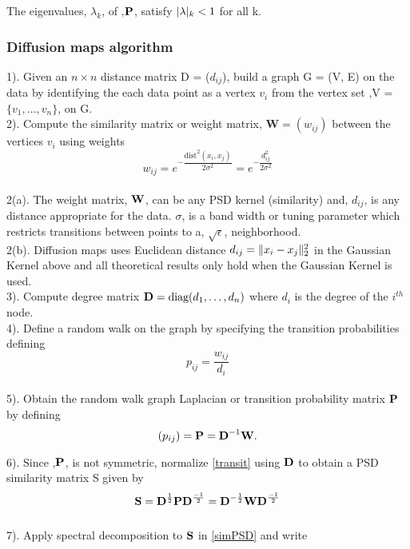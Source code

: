 The eigenvalues, $\lambda_{k}$, of ,$\textbf{P}$, satisfy $\lvert\lambda\rvert_{k} < 1$
for all k.

\subsubsection{Diffusion maps algorithm}
1). Given an $n \times n$ distance matrix D = ($d_{ij}$), build a graph G = (V, E) on the data by identifying the each data point
as a vertex $v_{i}$ from the vertex set  ,V = $\{v_{1}, \ldots, v_{n}\}$, on  G.\\
2). Compute the similarity matrix or weight matrix, $\bm{W} = (w_{ij})$ between
the vertices $v_{i}$ using weights
\[
w_{ij} = e^{-\dfrac{\text{dist}^{2}(x_{i}, x_{j})}{2\sigma^2}} 
= e^{-\dfrac{d_{ij}^{2}}{2\sigma^2}}
\] \\

2(a). The weight matrix, $\textbf{W}$, can be any PSD kernel (similarity) and, $d_{ij}$, is any distance appropriate for the data. $\sigma$, is a band width or tuning parameter which restricts transitions between points to a, $\sqrt{\epsilon}$, neighborhood.\\
2(b). Diffusion maps uses Euclidean distance 
$d_{ij} = \lVert x_{i} - x_{j}\rVert^{2}_{2}$ in the Gaussian Kernel above
and all theoretical results only hold when the Gaussian Kernel is used.\\
3). Compute degree matrix $\textbf{D} = \text{diag}(d_{1}, \ldots, d_{n})$
where $d_{i}$ is the degree of the $i^{th}$ node.\\
4). Define a random walk on the graph by specifying the transition probabilities
defining 
\[
p_{ij} = \frac{w_{ij}}{d_{i}}
\]\\
5). Obtain the random walk graph Laplacian or transition probability
matrix $\textbf{P}$ by defining 
\begin{equation}\label{transit} 
(p_{ij}) = \textbf{P} = \textbf{D}^{-1}\textbf{W}.
\end{equation}

6). Since ,$\textbf{P}$, is not symmetric, normalize \eqref{transit}
using $\textbf{D}$ to obtain a PSD similarity matrix S given by
\begin{equation}\label{simPSD}
\textbf{S} = \textbf{D}^{\frac{1}{2}}\textbf{P}\textbf{D}^{\frac{-1}{2}} = \textbf{D}^{-\frac{1}{2}}\textbf{W}\textbf{D}^{\frac{-1}{2}} 
\end{equation} \\

7). Apply spectral decomposition to $\textbf{S}$ in \eqref{simPSD} and write

